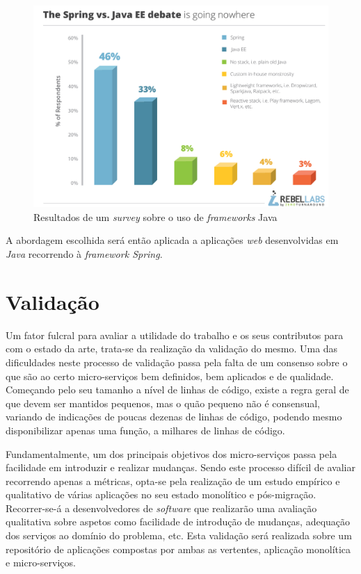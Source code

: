     
   	\begin{figure}[h!]
     	\begin{center}
     		\includegraphics[width=12cm]{img/java_frameworks.jpg}
     	\end{center}
     	\caption{Resultados de um \textit{survey} sobre o uso de \textit{frameworks} Java}
     	\label{fig:java_frameworks}
 	\end{figure} 
    
    A abordagem escolhida será então aplicada a aplicações \textit{web} desenvolvidas em \textit{Java} recorrendo à \textit{framework Spring}.
    
\section{Validação}

    Um fator fulcral para avaliar a utilidade do trabalho e os seus contributos para com o estado da arte, trata-se da realização da validação do mesmo. Uma das dificuldades neste processo de validação passa pela falta de um consenso sobre o que são ao certo micro-serviços bem definidos, bem aplicados e de qualidade. Começando pelo seu tamanho a nível de linhas de código, existe a regra geral de que devem ser mantidos pequenos, mas o quão pequeno não é consensual, variando de indicações de poucas dezenas de linhas de código, podendo mesmo disponibilizar apenas uma função, a milhares de linhas de código.
    
    Fundamentalmente, um dos principais objetivos dos micro-serviços passa pela facilidade em introduzir e realizar mudanças. Sendo este processo difícil de avaliar recorrendo apenas a métricas, opta-se pela realização de um estudo empírico e qualitativo de várias aplicações no seu estado monolítico e pós-migração. Recorrer-se-á a desenvolvedores de \textit{software} que realizarão uma avaliação qualitativa sobre aspetos como facilidade de introdução de mudanças, adequação dos serviços ao domínio do problema, etc. Esta validação será realizada sobre um repositório de aplicações compostas por ambas as vertentes, aplicação monolítica e micro-serviços.
    
